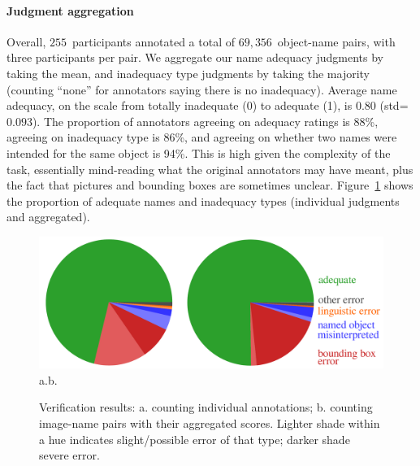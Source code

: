 



\paragraph{Judgment aggregation}
Overall, $255$~participants annotated a total of $69,356$~object-name pairs, with three participants per pair.
We aggregate our name adequacy judgments by taking the mean, and inadequacy type judgments by taking the majority (counting ``none'' for annotators saying there is no inadequacy). 
Average name adequacy, on the scale from totally inadequate (0) to adequate (1), is 0.80 (\mbox{std=$0.093$}).
The proportion of annotators agreeing on adequacy ratings is 88\%, agreeing on inadequacy type is 86\%, and agreeing on whether two names were intended for the same object is 94\%.
This is high given the complexity of the task, essentially mind-reading what the original \mn annotators may have meant, plus the fact that pictures and bounding boxes are sometimes unclear.
Figure~\ref{fig:verification-piechart} shows the proportion of adequate names and inadequacy types (individual judgments and aggregated).
\begin{figure}[t]
	\centering
	\includegraphics[width=\columnwidth]{images/verification_piechart_double.pdf}\\
	\hspace*{\fill}a.\hspace*{\fill}\hspace*{\fill}b.\hspace*{\fill}\hspace*{\fill}
	\caption{Verification results: a. counting individual annotations; b. counting image-name pairs with their aggregated scores. Lighter shade within a hue indicates slight/possible error of that type; darker shade severe error.}
	\label{fig:verification-piechart}
\end{figure}

